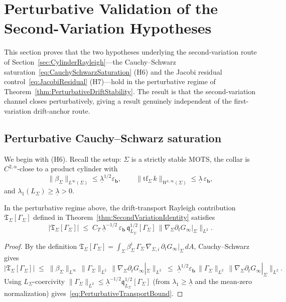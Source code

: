 \section{Perturbative Validation of the Second-Variation Hypotheses}
\label{sec:PerturbativeValidation}

This section proves that the two hypotheses underlying the second-variation route of Section~\ref{sec:CylinderRayleigh}---the Cauchy--Schwarz saturation~\eqref{eq:CauchySchwarzSaturation} (H6) and the Jacobi residual control~\eqref{eq:JacobiResidual} (H7)---hold in the perturbative regime of Theorem~\ref{thm:PerturbativeDriftStability}. The result is that the second-variation channel closes perturbatively, giving a result genuinely independent of the first-variation drift-anchor route.

\subsection{Perturbative Cauchy--Schwarz saturation}

We begin with (H6). Recall the setup: $\Sigma$ is a strictly stable MOTS, the collar is $C^{2,\alpha}$-close to a product cylinder with
\[
    \|\beta_\Sigma\|_{L^\infty(\Sigma)}\le\underline\lambda^{1/2}\varepsilon_{\mathbf b},\qquad
    \|\mathrm{tf}_\Sigma\,k\|_{W^{1,\infty}(\Sigma)}\le\underline\lambda\,\varepsilon_{\mathbf b},
\]
and $\lambda_1(L_\Sigma)\ge\underline\lambda>0$.

\begin{lemma}\label{lem:PerturbativeTransportBound}
In the perturbative regime above, the drift-transport Rayleigh contribution $\mathfrak T_\Sigma[\Gamma_\Sigma]$ defined in Theorem~\ref{thm:SecondVariationIdentity} satisfies
\begin{equation}\label{eq:PerturbativeTransportBound}
    |\mathfrak T_\Sigma[\Gamma_\Sigma]|
    \;\le\;
    C_T\,\underline\lambda^{-1/2}\,\varepsilon_{\mathbf b}\,\mathfrak q_{L_\Sigma}^{1/2}[\Gamma_\Sigma]\,\|\nabla_\Sigma\partial_t G_\infty|_\Sigma\|_{L^2}.
\end{equation}
\end{lemma}

\begin{proof}
By the definition $\mathfrak T_\Sigma[\Gamma_\Sigma]=\int_\Sigma\beta_\Sigma^i\,\Gamma_\Sigma\,\nabla_{\!\Sigma,i}\,\partial_t G_\infty|_\Sigma\,dA$, Cauchy--Schwarz gives
\[
    |\mathfrak T_\Sigma[\Gamma_\Sigma]|
    \;\le\;\|\beta_\Sigma\|_{L^\infty}\,\|\Gamma_\Sigma\|_{L^2}\,\|\nabla_\Sigma\partial_t G_\infty|_\Sigma\|_{L^2}
    \;\le\;\underline\lambda^{1/2}\varepsilon_{\mathbf b}\,\|\Gamma_\Sigma\|_{L^2}\,\|\nabla_\Sigma\partial_t G_\infty|_\Sigma\|_{L^2}.
\]
Using $L_\Sigma$-coercivity $\|\Gamma_\Sigma\|_{L^2}\le\underline\lambda^{-1/2}\mathfrak q_{L_\Sigma}^{1/2}[\Gamma_\Sigma]$ (from $\lambda_1\ge\underline\lambda$ and the mean-zero normalization) gives~\eqref{eq:PerturbativeTransportBound}.
\end{proof}

